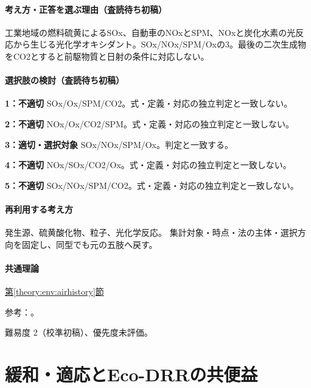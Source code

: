 \paragraph{考え方・正答を選ぶ理由（査読待ち初稿）} 工業地域の燃料硫黄によるSOx、自動車のNOxとSPM、NOxと炭化水素の光反応から生じる光化学オキシダント。SOx/NOx/SPM/Oxの3。最後の二次生成物をCO2とすると前駆物質と日射の条件に対応しない。

\paragraph{選択肢の検討（査読待ち初稿）}\mbox{}\par

\noindent\textbf{1：不適切} SOx/Ox/SPM/CO2。式・定義・対応の独立判定と一致しない。\par

\noindent\textbf{2：不適切} NOx/Ox/CO2/SPM。式・定義・対応の独立判定と一致しない。\par

\noindent\textbf{3：適切・選択対象} SOx/NOx/SPM/Ox。判定と一致する。\par

\noindent\textbf{4：不適切} NOx/SOx/CO2/Ox。式・定義・対応の独立判定と一致しない。\par

\noindent\textbf{5：不適切} SOx/NOx/SPM/CO2。式・定義・対応の独立判定と一致しない。\par

\paragraph{再利用する考え方} 発生源、硫黄酸化物、粒子、光化学反応。 集計対象・時点・法の主体・選択方向を固定し、同型でも元の五肢へ戻す。

\paragraph{共通理論} \hyperref[theory:env:airhistory]{第\ref*{theory:env:airhistory}節}

\par 参考：\cite{env58_pm25}。

\par 難易度 2（校準初稿）、優先度未評価。

\section{緩和・適応とEco-DRRの共便益}

